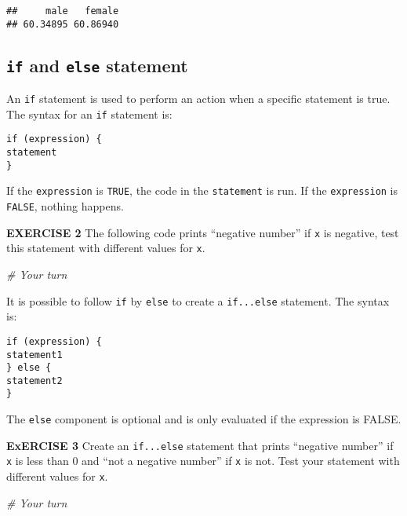 \documentclass[
]{article}
\newenvironment{Shaded}{\begin{snugshade}}{\end{snugshade}}
\newcommand{\CommentTok}[1]{\textcolor[rgb]{0.56,0.35,0.01}{\textit{#1}}}
\begin{document}
\begin{verbatim}
##     male   female 
## 60.34895 60.86940
\end{verbatim}

\hypertarget{if-and-else-statement}{%
\subsection{\texorpdfstring{\texttt{if} and \texttt{else}
statement}{if and else statement}}\label{if-and-else-statement}}

An \texttt{if} statement is used to perform an action when a specific
statement is true. The syntax for an \texttt{if} statement is:

\begin{verbatim}
if (expression) {
statement
}
\end{verbatim}

If the \texttt{expression} is \texttt{TRUE}, the code in the
\texttt{statement} is run. If the \texttt{expression} is \texttt{FALSE},
nothing happens.

\textbf{EXERCISE 2} The following code prints ``negative number'' if
\texttt{x} is negative, test this statement with different values for
\texttt{x}.

\begin{Shaded}
\begin{Highlighting}[]
\CommentTok{# Your turn}
\end{Highlighting}
\end{Shaded}

It is possible to follow \texttt{if} by \texttt{else} to create a
\texttt{if...else} statement. The syntax is:

\begin{verbatim}
if (expression) {
statement1
} else {
statement2
}
\end{verbatim}

The \texttt{else} component is optional and is only evaluated if the
expression is FALSE.

\textbf{ExERCISE 3} Create an \texttt{if...else} statement that prints
``negative number'' if \texttt{x} is less than 0 and ``not a negative
number'' if \texttt{x} is not. Test your statement with different values
for \texttt{x}.

\begin{Shaded}
\begin{Highlighting}[]
\CommentTok{# Your turn}
\end{Highlighting}
\end{Shaded}
\end{document}
